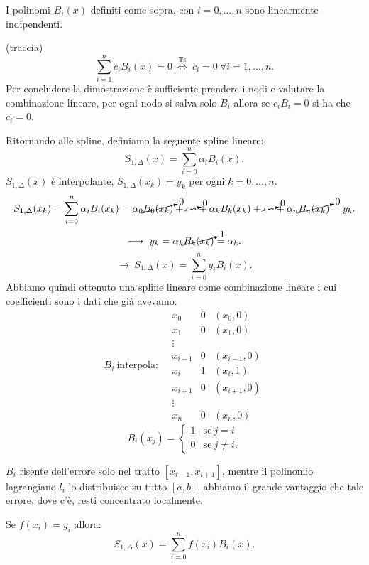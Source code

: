 \begin{prop}I polinomi
$B_i(x)$ definiti come sopra,
 con $i = 0, \ldots, n$ sono linearmente indipendenti.
\end{prop}
\begin{dimo}(traccia)
\[
\sum_{i=1}^n c_iB_i(x) = 0 \ \stackrel{\textrm{Ts}}{\Longleftrightarrow} \ 
c_i = 0\ \forall i = 1, \ldots, n. 
\]
Per concludere la dimostrazione è sufficiente prendere i nodi e valutare la
combinazione lineare, per ogni nodo si salva solo $B_i$ allora se $c_iB_i = 0$
si ha che $c_i = 0$.
\end{dimo}

Ritornando alle spline, definiamo la seguente spline lineare:
\[
S_{1,\Delta}(x) = \sum_{i=0}^n \alpha_iB_i(x).
\]
$S_{1,\Delta}(x)$ è interpolante, $S_{1,\Delta}(x_k) = y_k$ per ogni $k=0,\ldots,
n$.
\[
S_{1,\Delta}(x_k) = \sum_{i=0}^n \alpha_iB_i(x_k)=
\alpha_0\cancelto{0}{B_0(x_k)}+ \cancelto{0}{\cdots} + \alpha_kB_k(x_k) +
\cancelto{0}{\cdots} + \alpha_n\cancelto{0}{B_n(x_k)} = y_k.
\]
\[
\longrightarrow \ y_k = \alpha_k\cancelto{1}{B_k(x_k)} = \alpha_k.
\]
\[
\longrightarrow \ S_{1,\Delta}(x) = \sum_{i=0}^n y_iB_i(x).
\]
Abbiamo quindi ottenuto una spline lineare come combinazione lineare i cui
coefficienti sono i dati che già avevamo.
\[
B_i\ \textrm{interpola:} \quad\begin{array}{ccr}
x_0 & 0 & (x_0,0) \\
x_1 & 0 & (x_1,0) \\
\vdots \\
x_{i-1} & 0 & (x_{i-1},0) \\
x_i & 1 & (x_i,1)\\
x_{i+1} & 0 & (x_{i+1},0) \\
\vdots \\
x_n & 0 & (x_n,0) 
\end{array}
\]
\[
B_i(x_j) = \left\{ \begin{array}{lr}1 & \textrm{se} \ j=i \\ 0 &\textrm{se} 
\ j \neq i.\end{array}\right.
\]

\begin{osse}\label{oss8.17}
$B_i$ risente dell'errore solo nel tratto $[x_{i-1},x_{i+1}]$, mentre il
polinomio lagrangiano $l_i$ lo distribuisce su tutto $[a,b]$, abbiamo il 
grande vantaggio che tale errore, dove c'è, resti concentrato localmente.
\end{osse}

Se $f(x_i) = y_i$ allora:
\[S_{1,\Delta}(x) = \sum_{i=0}^n f(x_i)B_i(x).\]

